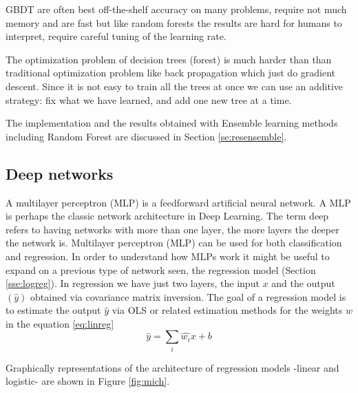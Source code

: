 \documentclass[11pt]{article}
\begin{document}
GBDT are often best off-the-shelf accuracy on many problems, require not much memory and are fast but like random forests the results are hard for humans to interpret, require careful tuning of the learning rate.

The optimization problem of decision trees (forest) is much harder than than traditional optimization problem like back propagation which just do gradient descent. Since it is not easy to train all the trees at once we can use an additive strategy: fix what we have learned, and add one new tree at a time. 

The implementation and the results obtained with Ensemble learning methods including Random Forest are discussed in Section \ref{se:resensemble}.


\subsection{Deep networks}
\label{se:deep}

A multilayer perceptron (MLP) is a feedforward artificial neural network. A MLP is perhaps the classic network architecture in Deep Learning. The term deep refers to having networks with more than one layer, the more layers the deeper the network is.
Multilayer perceptron (MLP) can be used for both classification and regression. In order to understand how MLPs work it might be useful to expand on a previous type of network seen, the regression model (Section \ref{sse:logreg}). In regression we have just two layers, the input $x$ and the output $(\hat{y})$ obtained via covariance matrix inversion. The goal of a regression model is to estimate the output $\hat{y}$ via OLS or related estimation methods for the weights $\hat{w}$ in the equation \ref{eq:linreg}
\begin{equation}
\hat{y} = \sum_i \hat{w_i} x + b
\label{eq:linreg}
\end{equation}
 
Graphically representations of the architecture of regression models -linear and logistic- are shown in Figure \ref{fig:mich}. 
\end{document}
